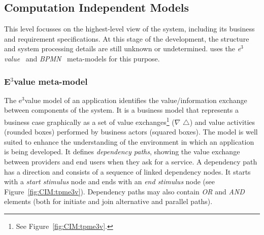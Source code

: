 \subsection{Computation Independent Models}

This level focusses on the highest-level view of the system, including its business and requirement specifications.
At this stage of the development, the structure and system processing details are still unknown or undetermined.  
\pisodm uses the \textit{e$^3$value}~\cite{Gordijn02valuebased} and \textit{BPMN}~\cite{BPMN} meta-models for this purpose. 

\subsubsection{E$^3$value meta-model}

The e$^3$value model of an application identifies the value/information exchange between components of the system. 
It is a business model that represents a business case graphically as a set of value exchanges\footnote{See Figure~\ref{fig:CIM:tpme3v}.} ($\nabla$ $\triangle$) and value activities (rounded boxes) performed by business actors (squared boxes).
The model is well suited to enhance the understanding of the environment in which an application is being developed. 
It defines \textit{dependency paths}, showing the value exchange between providers and end users when they ask for a service.
A dependency path has a direction and consists of a sequence of linked dependency nodes.
It starts with a \textit{start stimulus} node and ends with an \textit{end stimulus} node (see Figure~\ref{fig:CIM:tpme3v}). 
Dependency paths may also contain \textsl{OR} and \textsl{AND} elements (both for initiate and join alternative and parallel paths).

